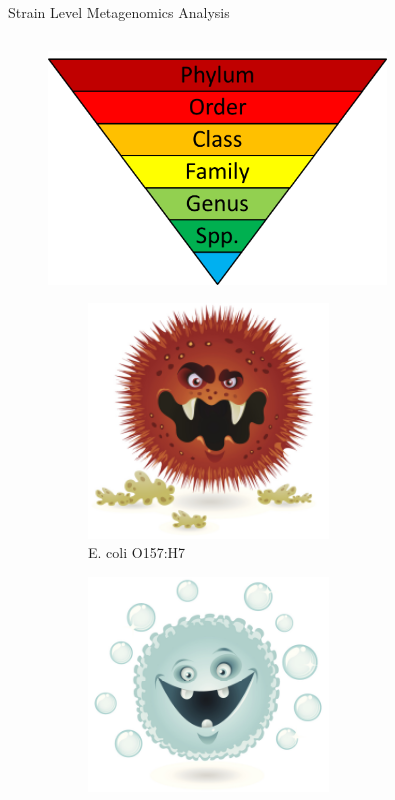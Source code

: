 \documentclass{beamer}
\begin{document}
\begin{frame}{Strain Level Metagenomics Analysis}
\begin{columns}
		\begin{column}[t]{.52\textwidth}
			\begin{figure}[ht]
				\centering
				\includegraphics[width=0.8\textwidth]{img/biology-classification.png}
				\caption*{\label{fig:biology}}
			\end{figure}
			\vspace{-1.6cm}
			\begin{figure}
				\begin{subfigure}[t]{.48\textwidth}
					\includegraphics[width=0.7\textwidth]{img/bad-bacteria.png}
					\caption{E. coli O157:H7}\label{fig:bad-bacteria}
				\end{subfigure}
				\hfill
				\begin{subfigure}[t]{.48\textwidth}
					\includegraphics[width=0.7\textwidth]{img/good-bacteria.png}

\end{subfigure}
\end{figure}
\end{column}
\end{columns}
\end{frame}
\end{document}
